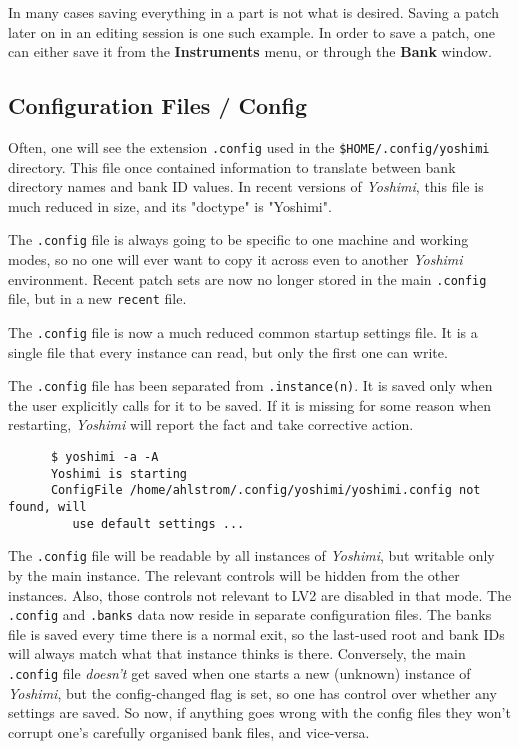    In many cases saving everything in a part is not what is desired.
   Saving a patch later on in an editing session is one such example.
   In order to save a patch, one can either save it from the
   \textbf{Instruments} menu, or through the \textbf{Bank} window.

\subsection{Configuration Files / Config}
\label{subsec:configuration_config}

   Often, one will see the extension \texttt{.config} used in the
   \texttt{\$HOME/.config/yoshimi} directory.  This file once contained
   information to translate between bank directory names and bank ID
   values.  In recent versions of \textsl{Yoshimi}, this file is much
   reduced in size, and its "doctype" is "Yoshimi".

   The \texttt{.config} file is always going to be specific to one machine and
   working modes, so no one will ever want to copy it across even to another
   \textsl{Yoshimi} environment.  Recent patch sets are now no longer stored in
   the main \texttt{.config} file, but in a new \texttt{recent} file.


   The \texttt{.config} file is now a much reduced common startup settings
   file.  It is a single file that every instance can read, but only the
   first one can write.

   The \texttt{.config} file has been separated from \texttt{.instance(n)}.
   It is saved only when the user explicitly calls for it to be saved. If
   it is missing for some reason when restarting, \textsl{Yoshimi} will
   report the fact and take corrective action.

   \begin{verbatim}
      $ yoshimi -a -A
      Yoshimi is starting
      ConfigFile /home/ahlstrom/.config/yoshimi/yoshimi.config not found, will
         use default settings ...
   \end{verbatim}

   The \texttt{.config} file will be readable by all instances of
   \textsl{Yoshimi}, but writable only by the main instance. The relevant
   controls will be hidden from the other instances.  Also, those controls not
   relevant to LV2 are disabled in that mode.  The \texttt{.config} and
   \texttt{.banks} data now reside in separate configuration files.  The banks
   file is saved every time there is a normal exit, so the last-used root and
   bank IDs will always match what that instance thinks is there.  Conversely,
   the main \texttt{.config} file \textsl{doesn't} get saved when one starts a
   new (unknown) instance of \textsl{Yoshimi}, but the config-changed flag is
   set, so one has control over whether any settings are saved.  So now, if
   anything goes wrong with the config files they won't corrupt one's carefully
   organised bank files, and vice-versa.

